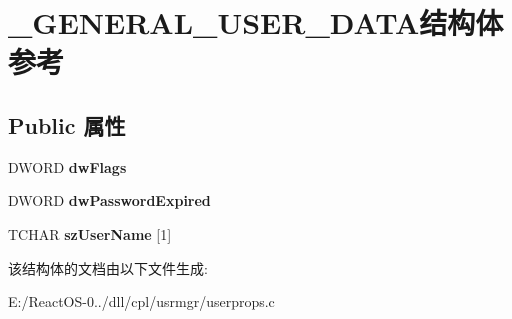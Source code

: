 \hypertarget{struct___g_e_n_e_r_a_l___u_s_e_r___d_a_t_a}{}\section{\+\_\+\+G\+E\+N\+E\+R\+A\+L\+\_\+\+U\+S\+E\+R\+\_\+\+D\+A\+T\+A结构体 参考}
\label{struct___g_e_n_e_r_a_l___u_s_e_r___d_a_t_a}
\subsection*{Public 属性}
\begin{DoxyCompactItemize}
\item 
\mbox{\label{struct___g_e_n_e_r_a_l___u_s_e_r___d_a_t_a_af52013ac6fb75e668832575a1d584559}} 
D\+W\+O\+RD {\bfseries dw\+Flags}
\item 
\mbox{\label{struct___g_e_n_e_r_a_l___u_s_e_r___d_a_t_a_a5238c645b989d12e72c87538901b7ecf}} 
D\+W\+O\+RD {\bfseries dw\+Password\+Expired}
\item 
\mbox{\label{struct___g_e_n_e_r_a_l___u_s_e_r___d_a_t_a_a82ff617435af9e4498ec52767347ccee}} 
T\+C\+H\+AR {\bfseries sz\+User\+Name} \mbox{[}1\mbox{]}
\end{DoxyCompactItemize}


该结构体的文档由以下文件生成\+:\begin{DoxyCompactItemize}
\item 
E\+:/\+React\+O\+S-\/0../dll/cpl/usrmgr/userprops.\+c\end{DoxyCompactItemize}
